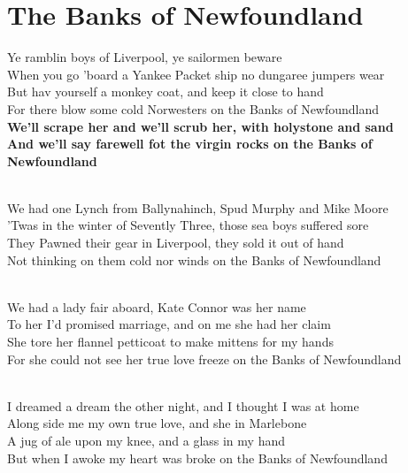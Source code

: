 \documentclass[letterpaper,14pt]{extarticle}
\begin{document}
\section{The Banks of Newfoundland}

\noindent
Ye ramblin boys of Liverpool, ye sailormen beware
\\When you go 'board a Yankee Packet ship no dungaree jumpers wear
\\But hav yourself a monkey coat, and keep it close to hand
\\For there blow some cold Norwesters on the Banks of Newfoundland
\\\textbf{We'll scrape her and we'll scrub her, with holystone and sand
\\And we'll say farewell fot the virgin rocks on the Banks of Newfoundland}

\noindent
\\We had one Lynch from Ballynahinch, Spud Murphy and Mike Moore
\\'Twas in the winter of Sevently Three, those sea boys suffered sore
\\They Pawned their gear in Liverpool, they sold it out of hand
\\Not thinking on them cold nor winds on the Banks of Newfoundland

\noindent
\\We had a lady fair aboard, Kate Connor was her name
\\To her I'd promised marriage, and on me she had her claim
\\She tore her flannel petticoat to make mittens for my hands
\\For she could not see her true love freeze on the Banks of Newfoundland

\noindent
\\I dreamed a dream the other night, and I thought I was at home
\\Along side me my own true love, and she in Marlebone
\\A jug of ale upon my knee, and a glass in my hand
\\But when I awoke my heart was broke on the Banks of Newfoundland
\end{document}
